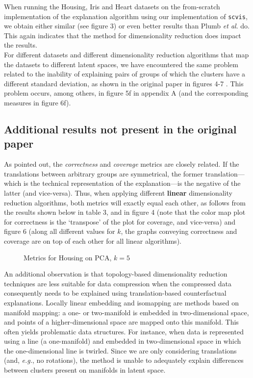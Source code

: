 When running the Housing, Iris and Heart datasets on the from-scratch implementation of the explanation algorithm using our implementation of \texttt{scvis}, we obtain either similar (see figure 3) or even better results than Plumb \textit{et al}. do. This again indicates that the method for dimensionality reduction does impact the results.\\

For different datasets and different dimensionality reduction algorithms that map the datasets to different latent spaces, we have encountered the same problem related to the inability of explaining pairs of groups of which the clusters have a different standard deviation, as shown in the original paper in figures 4-7 \citep[p.~4]{plumb2020explaining}. This problem occurs, among others, in figure 5f in appendix A (and the corresponding measures in figure 6f).

\subsection{Additional results not present in the original paper}

As \citep[p.~6]{plumb2020explaining} pointed out, the \textit{correctness} and \textit{coverage} metrics are closely related. If the translations between arbitrary groups are symmetrical, the former translation---which is the technical representation of the explanation---is the negative of the latter (and vice-versa). Thus, when applying different \textbf{linear} dimensionality reduction algorithms, both metrics will exactly equal each other, as follows from the results shown below in table 3, and in figure 4 (note that the color map plot for correctness is the `transpose' of the plot for coverage, and vice-versa) and figure 6 (along all different values for $k$, the graphs conveying correctness and coverage are on top of each other for all linear algorithms).\\
\begin{figure}
  \scalebox{0.12}{}
  \caption{Metrics for Housing on PCA, $k = 5$}
\end{figure}

An additional observation is that topology-based dimensionality reduction techniques are less suitable for data compression when the compressed data consequently needs to be explained using translation-based counterfactual explanations. Locally linear embedding and isomapping are methods based on manifold mapping: a one- or two-manifold is embedded in two-dimensional space, and points of a higher-dimensional space are mapped onto this manifold. This often yields problematic data structures. For instance, when data is represented using a line (a one-manifold) and embedded in two-dimensional space in which the one-dimensional line is twirled. Since we are only considering translations (and, \textit{e.g.}, no rotations), the method is unable to adequately explain differences between clusters present on manifolds in latent space.\\

